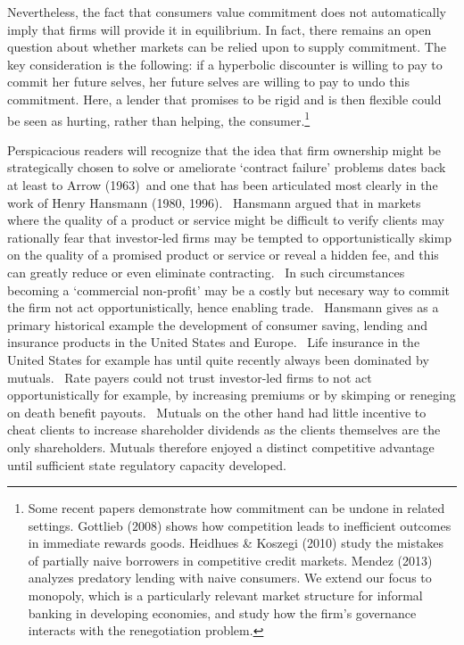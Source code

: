 \documentclass[11pt]{article}%
\begin{document}
Nevertheless, the fact that consumers value commitment does not automatically
imply that firms will provide it in equilibrium. In fact, there remains an
open question about whether markets can be relied upon to supply commitment.
The key consideration is the following: if a hyperbolic discounter is willing
to pay to commit her future selves, her future selves are willing to pay to
undo this commitment. Here, a lender that promises to be rigid and is then
flexible could be seen as hurting, rather than helping, the
consumer.\footnote{%
Some recent papers demonstrate how commitment can be undone
in related settings. Gottlieb (2008) shows how competition leads to
inefficient outcomes in immediate rewards goods. Heidhues \& Koszegi (2010)
study the mistakes of partially naive borrowers in competitive credit markets.
Mendez (2013) analyzes predatory lending with naive consumers. We extend our
focus to monopoly, which is a particularly relevant market structure for
informal banking in developing economies, and study how the firm's governance
interacts with the renegotiation problem.}

Perspicacious readers will recognize that the idea that firm ownership might
be strategically chosen to solve or ameliorate `contract failure' problems
dates back at least to Arrow (1963)\ and one that has been articulated most
clearly in the work of Henry Hansmann (1980, 1996). \ Hansmann argued that in
markets where the quality of a product or service might be difficult to verify
clients may rationally fear that investor-led firms may be tempted to
opportunistically skimp on the quality of a promised product or service or
reveal a hidden fee, and this can greatly reduce or even eliminate
contracting. \ In such circumstances becoming a `commercial non-profit' may be
a costly but necesary way to commit the firm not act opportunistically, hence
enabling trade. \ Hansmann gives as a primary historical example the
development of consumer saving, lending and insurance products in the United
States and Europe. \ Life insurance in the United States for example has until
quite recently always been dominated by mutuals. \ Rate payers could not trust
investor-led firms to not act opportunistically for example, by increasing
premiums or by skimping or reneging on death benefit payouts. \ Mutuals on the
other hand had little incentive to cheat clients to increase shareholder
dividends as the clients themselves are the only shareholders. Mutuals
therefore enjoyed a distinct competitive advantage until sufficient state
regulatory capacity developed.
\end{document}
